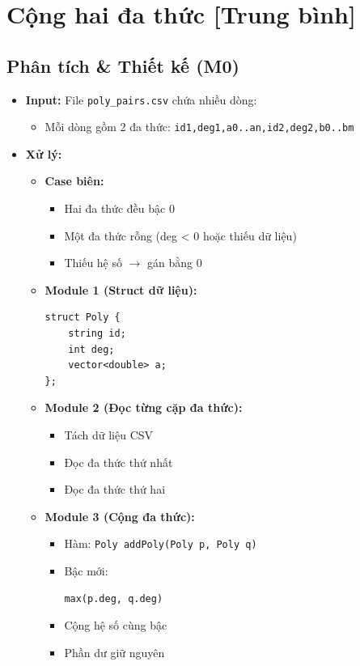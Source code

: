 \section{Cộng hai đa thức [Trung bình]}
\subsection{Phân tích \& Thiết kế (M0)}
\begin{itemize}
    \item \textbf{Input:}
    File \texttt{poly\_pairs.csv} chứa nhiều dòng:
    \begin{itemize}
        \item Mỗi dòng gồm 2 đa thức:
        \texttt{id1,deg1,a0..an,id2,deg2,b0..bm}
    \end{itemize}

    \item \textbf{Xử lý:}
    \begin{itemize}
        \item \textbf{Case biên:}
        \begin{itemize}
            \item Hai đa thức đều bậc 0
            \item Một đa thức rỗng (deg < 0 hoặc thiếu dữ liệu)
            \item Thiếu hệ số $\rightarrow$ gán bằng 0
        \end{itemize}

        \item \textbf{Module 1 (Struct dữ liệu):}
\begin{lstlisting}
struct Poly {
    string id;
    int deg;
    vector<double> a;
};
\end{lstlisting}

        \item \textbf{Module 2 (Đọc từng cặp đa thức):}
        \begin{itemize}
            \item Tách dữ liệu CSV
            \item Đọc đa thức thứ nhất
            \item Đọc đa thức thứ hai
        \end{itemize}

        \item \textbf{Module 3 (Cộng đa thức):}
        \begin{itemize}
            \item Hàm:
            \texttt{Poly addPoly(Poly p, Poly q)}
            \item Bậc mới:
\begin{lstlisting}
max(p.deg, q.deg)
\end{lstlisting}
            \item Cộng hệ số cùng bậc
            \item Phần dư giữ nguyên
        \end{itemize}


\end{itemize}
\end{itemize}
